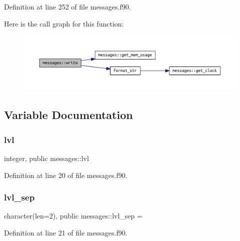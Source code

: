 Definition at line 252 of file messages.\+f90.

Here is the call graph for this function\+:
\nopagebreak
\begin{figure}[H]
\begin{center}
\leavevmode
\includegraphics[width=350pt]{namespacemessages_aa4a8d01563e92558e8a0875b075ec54c_cgraph}
\end{center}
\end{figure}


\subsection{Variable Documentation}
\mbox{\label{namespacemessages_a36521a46e57da1d3be83019abdff132e}} 
\subsubsection{\texorpdfstring{lvl}{lvl}}
{\footnotesize\ttfamily integer, public messages\+::lvl}



Definition at line 20 of file messages.\+f90.

\mbox{\label{namespacemessages_ab1101c3acf2edc71877d4aa71aa3d931}} 
\subsubsection{\texorpdfstring{lvl\+\_\+sep}{lvl\_sep}}
{\footnotesize\ttfamily character(len=2), public messages\+::lvl\+\_\+sep = \textquotesingle{}\textquotesingle{}}



Definition at line 21 of file messages.\+f90.

\mbox{\label{namespacemessages_a07070e72f15146af24816c39eea17088}} 
